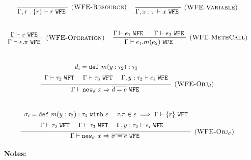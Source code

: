 \documentclass{llncs}
\newcommand{\keywadj}[1]{\mathtt{#1}}
\newcommand{\keyw}[1]{\keywadj{#1}~}
\newcommand{\kw}[1]{\keyw{ #1 }}
\newcommand{\kwa}[1]{\keywadj{ #1 }}
\newcommand{\newd}[0]{
	\keywadj{new}_d~x \Rightarrow \overline{d = e}
}
\newcommand{\newsig}[0]{
	\keywadj{new}_\sigma~x \Rightarrow \overline{\sigma = e}
}
\begin{document}
\[
\begin{array}{c}


\infer[\textsc{(WFE-Resource)}]
	{ \Gamma, r : \{ r \} \vdash r~\kw{WFE} }
	{ } 
	
	~~~~
	
\infer[\textsc{(WFE-Variable)}]
	{ \Gamma, x : \tau \vdash x~\kw{WFE} }
	{}
	
	\\[5ex]
	
\infer[\textsc{(WFE-Operation)}]
	{ \Gamma \vdash e.\pi~\kw{WFE}}
	{ \Gamma \vdash e ~\kw{WFE}}
	
	~~~~
	

\infer[\textsc{(WFE-MethCall)}]
	{ \Gamma \vdash e_1.m(e_2) ~\kw{WFE}}
	{ \Gamma \vdash e_1~\kw{WFE} ~~~~ \Gamma \vdash e_2~\kw{WFE}}

	\\[5ex]
	
	
\infer[\textsc{(WFE-Obj$_d$)}]
	{ \Gamma \vdash \newd~\kw{WFE}}
{{\def\arraystretch{1.4}
  \begin{array}{c}
d_i = \kw{def} m(y: \tau_2): \tau_3 \\ \Gamma \vdash \tau_2 ~\kwa{WFT} ~~~~ \Gamma \vdash \tau_3~\kwa{WFT } ~~~~ \Gamma, y : \tau_2 \vdash e_i ~\kwa{WFE}
  \end{array}}}

	\\[5ex]

\infer[\textsc{(WFE-Obj$_\sigma$)}]
	{ \Gamma \vdash \newsig~\kw{WFE}}
{{\def\arraystretch{1.4}
  \begin{array}{c}
\sigma_i = \kw{def} m(y: \tau_2): \tau_3~\kw{with} \varepsilon ~~~~ r.\pi \in \varepsilon \implies \Gamma \vdash \{ r \} ~ \kwa{WFT} \\  \Gamma \vdash \tau_2 ~\kwa{WFT} ~~~~ \Gamma \vdash \tau_3~\kwa{WFT} ~~~~ \Gamma, y : \tau_2 \vdash e_i ~\kwa{WFE} ~~~~ 
  \end{array}}}

\end{array}
\]

\noindent \textbf{Notes:}
\end{document}
